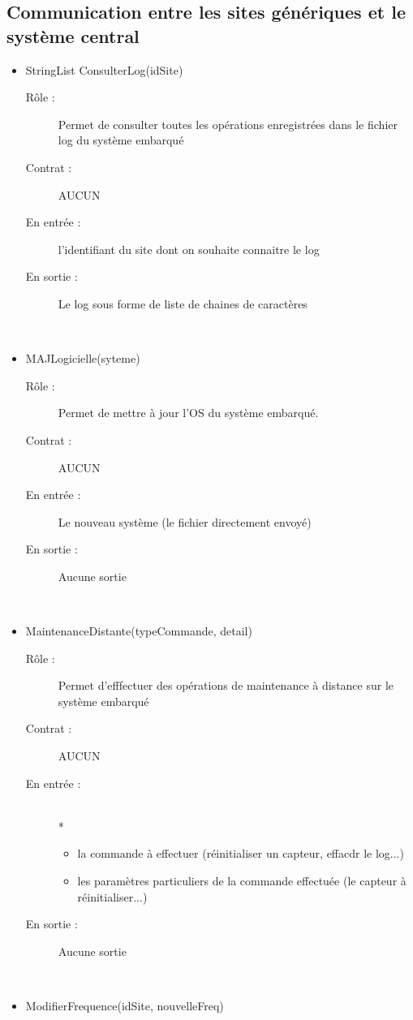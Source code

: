 \subsection{Communication entre les sites génériques et le système central}
\begin{itemize}
	\item StringList ConsulterLog(idSite)
	\begin{description} 
		\item[Rôle :] Permet de consulter toutes les opérations enregistrées dans le fichier log du système embarqué
		\item[Contrat :] AUCUN 
		\item[En entrée :] l'identifiant du site dont on souhaite connaitre le log
		\item[En sortie :] Le log sous forme de liste de chaines de caractères
	\end{description}
	~\\
	\item MAJLogicielle(syteme)
	\begin{description} 
		\item[Rôle :] Permet de mettre à jour l'OS du système embarqué.
		\item[Contrat :] AUCUN 
		\item[En entrée :] Le nouveau système (le fichier directement envoyé)
		\item[En sortie :] Aucune sortie
	\end{description}
	~\\
	\item MaintenanceDistante(typeCommande, detail)
	\begin{description} 
		\item[Rôle :] Permet d'efffectuer des opérations de maintenance à distance sur le système embarqué
		\item[Contrat :] AUCUN 
		\item[En entrée :]
		 ~\\*
		\begin{itemize}
			\item la commande à effectuer (réinitialiser un capteur, effacdr le log...)
			\item les paramètres particuliers de la commande effectuée (le capteur à réinitialiser...)
		\end{itemize}
		\item[En sortie :] Aucune sortie
	\end{description}
	~\\
	\item ModifierFrequence(idSite, nouvelleFreq)

\end{itemize}
